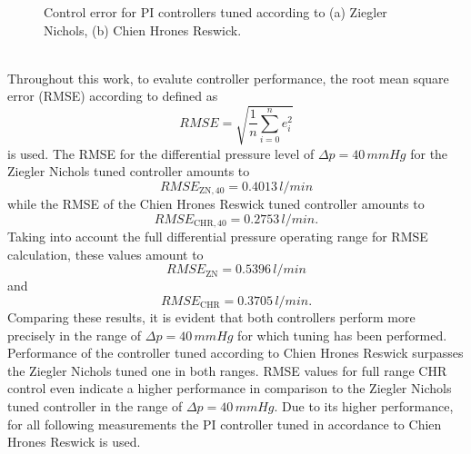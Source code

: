 \begin{figure}[ht]
  \centering
  \caption[Control error for PI Controllers]{Control error for PI controllers tuned according to (a) Ziegler Nichols, (b) Chien Hrones Reswick.}
  \label{fig:PI_error}
\end{figure}
\\Throughout this work, to evalute controller performance, the root mean square error (RMSE) according to \cite{RMSE} defined as
\begin{equation}
  RMSE = \sqrt{\frac{1}{n}\sum_{i=0}^n e_i^2}
\end{equation}
is used. The RMSE for the differential pressure level of $\Delta{p}=40\,mmHg$ for the Ziegler Nichols tuned controller amounts to
\begin{equation}
  RMSE_{\mathrm{ZN,40}}=0.4013\,l/min
\end{equation}
while the RMSE of the Chien Hrones Reswick tuned controller amounts to
\begin{equation}
  RMSE_{\mathrm{CHR,40}}=0.2753\,l/min.
\end{equation}
\newpage
Taking into account the full differential pressure operating range for RMSE calculation, these values amount to
\begin{equation}
  RMSE_{\mathrm{ZN}}=0.5396\,l/min
\end{equation}
and
\begin{equation}
  RMSE_{\mathrm{CHR}}=0.3705\,l/min.
\end{equation}
Comparing these results, it is evident that both controllers perform more precisely in the range of $\Delta{p}=40\,mmHg$ for which tuning has been performed.
Performance of the controller tuned according to Chien Hrones Reswick surpasses the Ziegler Nichols tuned one in both ranges. RMSE values for full range CHR control even indicate a higher performance in comparison to the Ziegler Nichols tuned controller in the range of $\Delta{p}=40\,mmHg$.
\newpage
Due to its higher performance, for all following measurements the PI controller tuned in accordance to Chien Hrones Reswick is used.
